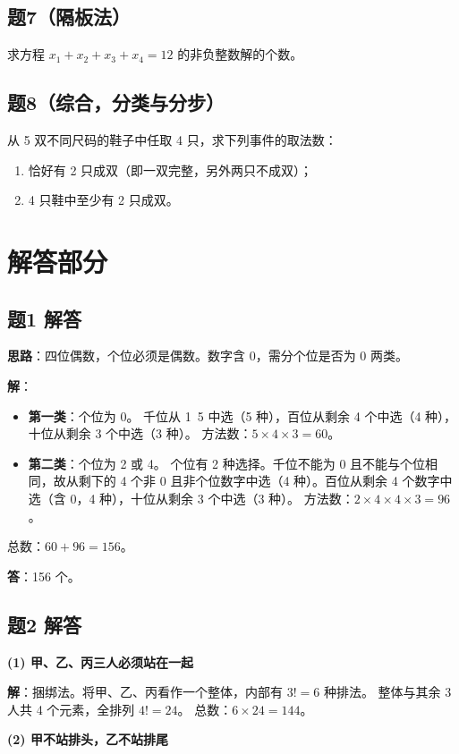\documentclass[10pt]{article}
\begin{document}
\subsection*{题7（隔板法）}
求方程 \(x_1 + x_2 + x_3 + x_4 = 12\) 的非负整数解的个数。

\subsection*{题8（综合，分类与分步）}
从 5 双不同尺码的鞋子中任取 4 只，求下列事件的取法数：
\begin{enumerate}
\item 恰好有 2 只成双（即一双完整，另外两只不成双）；
\item 4 只鞋中至少有 2 只成双。
\end{enumerate}

\section*{解答部分}

\subsection*{题1 解答}
\textbf{思路}：四位偶数，个位必须是偶数。数字含 0，需分个位是否为 0 两类。

\textbf{解}：
\begin{itemize}
\item \textbf{第一类}：个位为 0。
  千位从 1~5 中选（5 种），百位从剩余 4 个中选（4 种），十位从剩余 3 个中选（3 种）。
  方法数：\(5 \times 4 \times 3 = 60\)。
\item \textbf{第二类}：个位为 2 或 4。
  个位有 2 种选择。千位不能为 0 且不能与个位相同，故从剩下的 4 个非 0 且非个位数字中选（4 种）。百位从剩余 4 个数字中选（含 0，4 种），十位从剩余 3 个中选（3 种）。
  方法数：\(2 \times 4 \times 4 \times 3 = 96\)。
\end{itemize}
总数：\(60 + 96 = 156\)。

\textbf{答}：156 个。

\subsection*{题2 解答}
\textbf{(1) 甲、乙、丙三人必须站在一起}

\textbf{解}：捆绑法。将甲、乙、丙看作一个整体，内部有 \(3! = 6\) 种排法。
整体与其余 3 人共 4 个元素，全排列 \(4! = 24\)。
总数：\(6 \times 24 = 144\)。

\textbf{(2) 甲不站排头，乙不站排尾}
\end{document}
